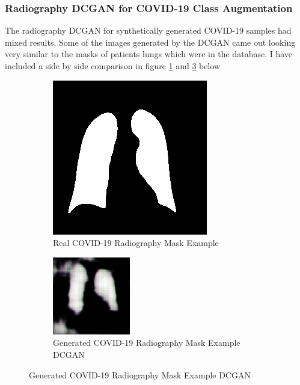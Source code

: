 \subsubsection{Radiography DCGAN for COVID-19 Class Augmentation}
The radiography DCGAN for synthetically generated COVID-19 samples had mixed results.  Some of the images generated by the DCGAN came out looking very similar to the masks of patients lungs which were in the database.  I have included a side by side comparison in figure \ref{fig:Real COVID-19 Radiography Mask Example} and \ref{fig:Synthetically Generated COVID-19 Radiography Mask(DCGAN)} below
 \begin{figure}[H]
    \centering
    \begin{subfigure}{.4\textwidth}
    \centering
      \includegraphics[width=.4\linewidth,keepaspectratio]{Images/Radiography_Real_Mask_COVID19_Example.png}
      \caption{Real COVID-19 Radiography Mask Example}
      \label{fig:Real COVID-19 Radiography Mask Example}
    \end{subfigure}\hfill%
    \begin{subfigure}{.4\textwidth}
    \centering
      \includegraphics[width=.4\linewidth,keepaspectratio]{Images/Radiography_GAN_Mask_COVID19_Example.png}
      \caption{Generated COVID-19 Radiography Mask Example DCGAN}
      \label{fig:Synthetically Generated COVID-19 Radiography Mask(DCGAN)}
    \end{subfigure}\hfill%
\end{figure}
